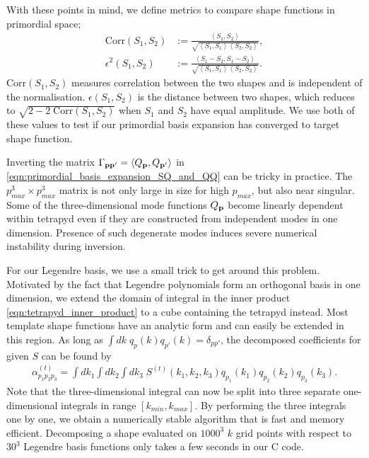 With these points in mind, we define metrics to compare shape functions in primordial space;
\begin{align}
	\text{Corr}(S_1, S_2) &:= \frac{\left< S_1, S_2 \right>}{ \sqrt{ \left< S_1, S_1 \right> \left< S_2, S_2 \right> } }, \\
	\epsilon^2(S_1, S_2) &:= \frac{\left< S_1 - S_2, S_1 - S_2 \right> }{\sqrt{\left< S_1, S_1 \right> \left< S_2, S_2 \right>}}.
\end{align}
Corr$(S_1,S_2)$ measures correlation between the two shapes and is independent of the normalisation. $\epsilon(S_1,S_2)$ is the distance between two shapes, which reduces to $\sqrt{2 - 2\;\text{Corr}(S_1,S_2)}$ when $S_1$ and $S_2$ have equal amplitude. We use both of these values to test if our primordial basis expansion has converged to target shape function. 

Inverting the matrix $\Gamma_{\mathbf{p} \mathbf{p}'} = \left< Q_\mathbf{p}, Q_{\mathbf{p}'} \right>$ in \eqref{eqn:primordial_basis_expansion_SQ_and_QQ} can be tricky in practice. The $p_{max}^3 \times p_{max}^3$ matrix is not only large in size for high $p_{max}$, but also near singular. Some of the three-dimensional mode functions $Q_\mathbf{p}$ become linearly dependent within tetrapyd even if they are constructed from independent modes in one dimension. Presence of such degenerate modes induces severe numerical instability during inversion.

For our Legendre basis, we use a small trick to get around this problem. Motivated by the fact that Legendre polynomials form an orthogonal basis in one dimension, we extend the domain of integral in the inner product \eqref{eqn:tetrapyd_inner_product} to a cube containing the tetrapyd instead. Most template shape functions have an analytic form and can easily be extended in this region. As long as $\int dk \; q_p(k) q_{p'}(k) = \delta_{pp'}$, the decomposed coefficients for given $S$ can be found by
\begin{align}
	\alpha^{(t)}_{p_1 p_2 p_3} = \int dk_1 \int dk_2 \int dk_3 \; S^{(t)}(k_1, k_2, k_3) q_{p_1}(k_1) q_{p_2}(k_2) q_{p_3}(k_3). \label{eqn:basis_expansion}
\end{align}
Note that the three-dimensional integral can now be split into three separate one-dimensional integrals in range $[k_{min}, k_{max}]$. By performing the three integrals one by one, we obtain a numerically stable algorithm that is fast and memory efficient. Decomposing a shape evaluated on $1000^3$ $k$ grid points with respect to $30^3$ Legendre basis functions only takes a few seconds in our \textsc{C} code.

